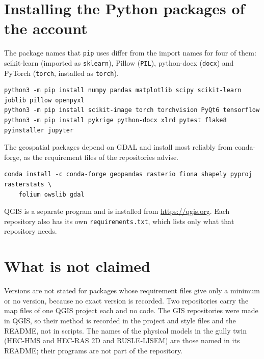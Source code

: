 \documentclass[11pt,a4paper]{article}
\begin{document}
\section{Installing the Python packages of the account}
The package names that \texttt{pip} uses differ from the import names for four of them: scikit-learn (imported as \texttt{sklearn}), Pillow (\texttt{PIL}), python-docx (\texttt{docx}) and PyTorch (\texttt{torch}, installed as \texttt{torch}).
\begin{verbatim}
python3 -m pip install numpy pandas matplotlib scipy scikit-learn joblib pillow openpyxl
python3 -m pip install scikit-image torch torchvision PyQt6 tensorflow
python3 -m pip install pykrige python-docx xlrd pytest flake8 pyinstaller jupyter
\end{verbatim}
The geospatial packages depend on GDAL and install most reliably from conda-forge, as the requirement files of the repositories advise.
\begin{verbatim}
conda install -c conda-forge geopandas rasterio fiona shapely pyproj rasterstats \
    folium owslib gdal
\end{verbatim}
QGIS is a separate program and is installed from \url{https://qgis.org}. Each repository also has its own \texttt{requirements.txt}, which lists only what that repository needs.

\section{What is not claimed}
Versions are not stated for packages whose requirement files give only a minimum or no version, because no exact version is recorded. Two repositories carry the map files of one QGIS project each and no code. The GIS repositories were made in QGIS, so their method is recorded in the project and style files and the README, not in scripts. The names of the physical models in the gully twin (HEC-HMS and HEC-RAS 2D and RUSLE-LISEM) are those named in its README; their programs are not part of the repository.
\end{document}
